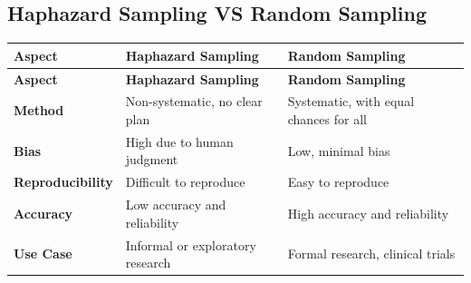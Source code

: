 \subsection{Haphazard Sampling VS Random Sampling \cite{common/online/chatgpt}}\label{Sampling Plans/Important Notes/Haphazard Sampling VS Random Sampling}

\begin{customArrayStretch}{1.3}
\begin{longtable}{|p{3cm}|p{6cm}|p{6cm}|}

\hline
\textbf{Aspect} & \textbf{Haphazard Sampling} & \textbf{Random Sampling} \\ \hline
\endfirsthead

\hline
\textbf{Aspect} & \textbf{Haphazard Sampling} & \textbf{Random Sampling} \\ \hline
\endhead

\hline\endlastfoot
\hline\endfoot



\textbf{Method} & 
    Non-systematic, no clear plan & 
    Systematic, with equal chances for all \\ \hline

\textbf{Bias} & 
    High due to human judgment & 
    Low, minimal bias \\ \hline

\textbf{Reproducibility} & 
    Difficult to reproduce & 
    Easy to reproduce \\ \hline

\textbf{Accuracy} & 
    Low accuracy and reliability & 
    High accuracy and reliability \\ \hline

\textbf{Use Case} & 
    Informal or exploratory research & 
    Formal research, clinical trials \\ \hline



\end{longtable}
\end{customArrayStretch}








